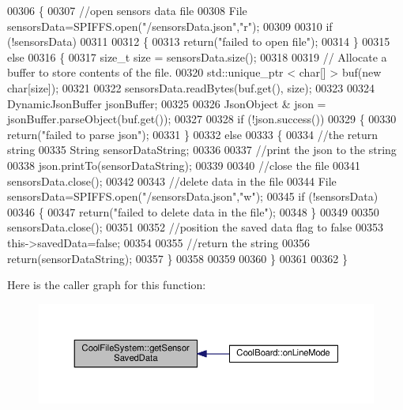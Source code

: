 \begin{DoxyCode}
00306 \{
00307     \textcolor{comment}{//open sensors data file}
00308     File sensorsData=SPIFFS.open(\textcolor{stringliteral}{"/sensorsData.json"},\textcolor{stringliteral}{"r"});
00309     
00310     \textcolor{keywordflow}{if} (!sensorsData)
00311 
00312     \{
00313         \textcolor{keywordflow}{return}(\textcolor{stringliteral}{"failed to open file"});
00314     \}
00315     \textcolor{keywordflow}{else}
00316     \{
00317         \textcolor{keywordtype}{size\_t} size = sensorsData.size();
00318 
00319         \textcolor{comment}{// Allocate a buffer to store contents of the file.}
00320         std::unique\_ptr < char[] > buf(\textcolor{keyword}{new} \textcolor{keywordtype}{char}[size]);
00321 
00322         sensorsData.readBytes(buf.get(), size);
00323 
00324         DynamicJsonBuffer jsonBuffer;
00325 
00326         JsonObject & json = jsonBuffer.parseObject(buf.get());
00327         
00328         \textcolor{keywordflow}{if} (!json.success())
00329         \{
00330             \textcolor{keywordflow}{return}(\textcolor{stringliteral}{"failed to parse json"});
00331         \}
00332         \textcolor{keywordflow}{else}
00333         \{   
00334             \textcolor{comment}{//the return string}
00335             String sensorDataString;
00336             
00337             \textcolor{comment}{//print the json to the string}
00338             json.printTo(sensorDataString);
00339             
00340             \textcolor{comment}{//close the file}
00341             sensorsData.close();
00342 
00343             \textcolor{comment}{//delete data in the file}
00344             File sensorsData=SPIFFS.open(\textcolor{stringliteral}{"/sensorsData.json"},\textcolor{stringliteral}{"w"});
00345             \textcolor{keywordflow}{if} (!sensorsData)   
00346             \{
00347                 \textcolor{keywordflow}{return}(\textcolor{stringliteral}{"failed to delete data in the file"});
00348             \}
00349 
00350             sensorsData.close();
00351             
00352             \textcolor{comment}{//position the saved data flag to false}
00353             this->savedData=\textcolor{keyword}{false};          
00354 
00355             \textcolor{comment}{//return the string}
00356             \textcolor{keywordflow}{return}(sensorDataString);       
00357         \}
00358         
00359         
00360     \}
00361 
00362 \}
\end{DoxyCode}
Here is the caller graph for this function\+:
\nopagebreak
\begin{figure}[H]
\begin{center}
\leavevmode
\includegraphics[width=350pt]{class_cool_file_system_a5c58bca3735c0ed3efb268d70ef998ef_icgraph}
\end{center}
\end{figure}
